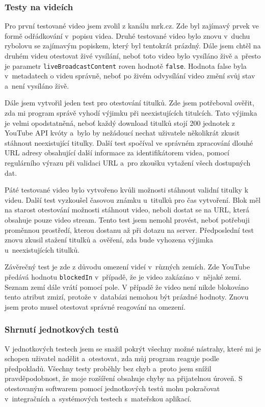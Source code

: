 \subsubsection{Testy na videích}
\par Pro první testované video jsem zvolil  z kanálu mrk.cz. Zde byl zajímavý prvek ve formě odřádkování v~popisu videa. Druhé testované video bylo znovu v~duchu rybolovu se zajímavým popiskem, který byl tentokrát prázdný. Dále jsem chtěl na druhém videu otestovat živé vysílání, neboť toto video bylo vysíláno živě a~přesto je parametr \texttt{liveBroadcastContent} roven hodnotě \texttt{false}. Hodnota false byla v~metadatech o videu správně, neboť po živém odvysílání video změní svůj stav a~není vysíláno živě.
\par Dále jsem vytvořil jeden test pro otestování titulků. Zde jsem potřeboval ověřit, zda mi program správě vyhodí výjimku při neexistujících titulcích. Tato výjimka je velmi opodstatněná, neboť každý download titulků stojí 200 jednotek z YouTube API kvóty a~bylo by nežádoucí nechat uživatele několikrát zkusit stáhnout neexistující titulky. Další test spočíval ve správném zpracování dlouhé URL adresy  obsahující další informace za identifikátorem videa, pomocí regulárního výrazu při validaci URL a~pro zkoušku vytažení všech dostupných dat.
\par Páté testované video bylo vytvořeno kvůli možnosti stáhnout validní titulky k videu. Další test vyzkoušel časovou známku u~titulků pro čas vytvoření. Blok  měl na starost otestování možnosti stáhnout video, neboli dostat se na URL, která obsahuje pouze video stream. Tento test jsem nemohl provést, neboť potřebuji proměnnou prostředí, kterou dostanu až při dotazu na server. Předposlední test znovu zkusil stažení titulků a~ověření, zda bude vyhozena výjimka u~neexistujících titulků.
\par Závěrečný test je zde z důvodu omezení videí v~různých zemích. Zde YouTube předává hodnotu \texttt{blockedIn} v~případě, že je video zakázáno v~nějaké zemi. Seznam zemí dále vrátí pomocí pole. V případě že video není nikde blokováno tento atribut zmizí, protože v~databázi nemohou být prázdné hodnoty. Znovu jsem proto musel otestovat správné reagování na omezení.
\subsubsection{Shrnutí jednotkových testů}
\par V jednotkových testech jsem se snažil pokrýt všechny možné nástrahy, které mi je schopen uživatel nadělit a~otestovat, zda můj program reaguje podle předpokladů. Všechny testy proběhly bez chyb a~proto jsem snížil pravděpodobnost, že moje rozšíření obsahuje chyby na přijatelnou úroveň. S otestovaným softwarem pomocí jednotkových testů mohu pokračovat v~integračních a~systémových testech s~mateřskou aplikací.
